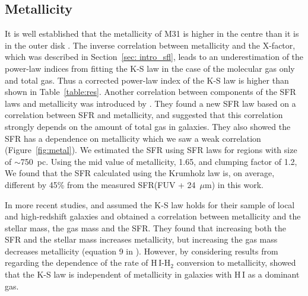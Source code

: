 \subsection{Metallicity}
\label{sec:fittingmetal}
It is well established that the metallicity of M31 is higher in the centre than it is in the outer disk  \citep[e.g.][]{Draine14}. The inverse correlation between metallicity and the X-factor, which was described in Section~\ref{sec: intro_sfl}, leads to an underestimation of the power-law indices from fitting the K-S law in the case of the molecular gas only and total gas. 
Thus a corrected power-law index of the K-S law is higher than shown in Table~\ref{table:res}. Another correlation between components of the SFR laws and metallicity was introduced by \citet{Krumholz09}. 
They found a new SFR law based on a correlation between SFR and metallicity, and suggested that this correlation strongly depends on the amount of total gas in galaxies. They also showed the SFR has a dependence on metallicity which we saw a weak correlation (Figure~\ref{fig:metal}).
 We estimated the SFR using \citet{Krumholz09} SFR laws for regions with size of $\sim$750~pc.
Using the mid value of metallicity, 1.65, and clumping factor of 1.2, We found that the SFR calculated using the Krumholz law is, on average, different by 45\% from the measured SFR(FUV + 24~$\mu$m) in this work. 

In more recent studies, \citet{Mannucci10} and \citet{Lilly13} assumed the K-S law holds for their sample of local and high-redshift galaxies and obtained a correlation between metallicity and the stellar mass, the gas mass and the SFR. 
They found that increasing both the SFR and the stellar mass increases metallicity, but increasing the gas mass decreases metallicity (equation 9 in \citep{Mannucci10}). 
However, by considering results from \citet{wong13} regarding the dependence of the rate of H\,{\sc I}-H$_2$ conversion to metallicity, \citet{Roychowdhury15} showed that the K-S law is independent of metallicity in galaxies with H\,{\sc I} as a dominant gas. 

